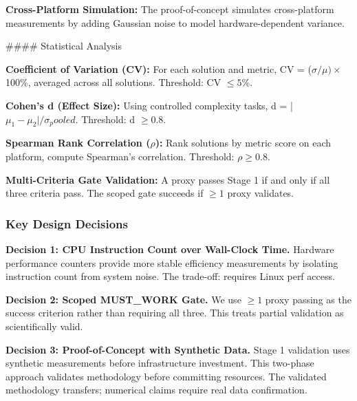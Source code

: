 \textbf{Cross-Platform Simulation:} The proof-of-concept simulates cross-platform measurements by adding Gaussian noise to model hardware-dependent variance.

\#\#\#\# Statistical Analysis

\textbf{Coefficient of Variation (CV):} For each solution and metric, CV = ($\sigma / \mu ) \times$ 100\%, averaged across all solutions. Threshold: CV $\leq 5$\%.

\textbf{Cohen's d (Effect Size):} Using controlled complexity tasks, d = |$\mu _1 - \mu _{2}| / \sigma _pooled$. Threshold: d $\geq 0.8$.

\textbf{Spearman Rank Correlation ($\rho$):} Rank solutions by metric score on each platform, compute Spearman's correlation. Threshold: $\rho \geq 0.8$.

\textbf{Multi-Criteria Gate Validation:} A proxy passes Stage 1 if and only if all three criteria pass. The scoped gate succeeds if $\geq 1$ proxy validates.

\subsubsection{Key Design Decisions}

\textbf{Decision 1: CPU Instruction Count over Wall-Clock Time.} Hardware performance counters provide more stable efficiency measurements by isolating instruction count from system noise. The trade-off: requires Linux perf access.

\textbf{Decision 2: Scoped MUST\_WORK Gate.} We use $\geq 1$ proxy passing as the success criterion rather than requiring all three. This treats partial validation as scientifically valid.

\textbf{Decision 3: Proof-of-Concept with Synthetic Data.} Stage 1 validation uses synthetic measurements before infrastructure investment. This two-phase approach validates methodology before committing resources. The validated methodology transfers; numerical claims require real data confirmation.
